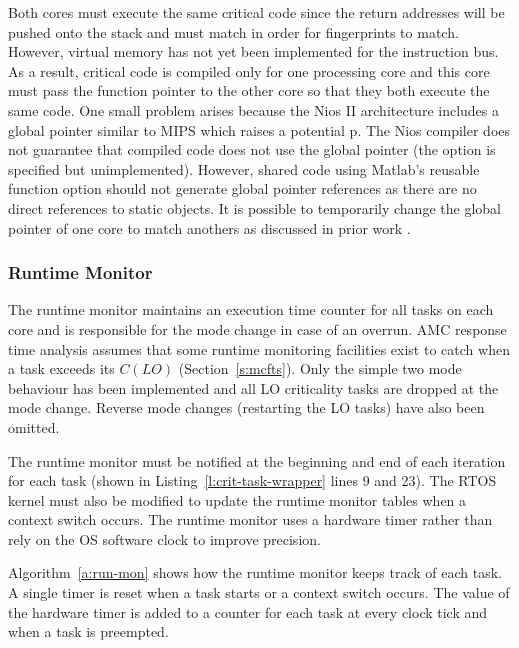 
	Both cores must execute the same critical code since the return addresses will be pushed onto the stack and must match in order for fingerprints to match. 
	However, virtual memory has not yet been implemented for the instruction bus. 
	As a result, critical code is compiled only for one processing core and this core must pass the function pointer to the other core so that they both execute the same code. 
	One small problem arises because the Nios II architecture includes a global pointer similar to MIPS which raises a potential p.
	The Nios compiler does not guarantee that compiled code does not use the global pointer (the option is specified but unimplemented). 
	However, shared code using Matlab's reusable function option should not generate global pointer references as there are no direct references to static objects. 
	It is possible to temporarily change the global pointer of one core to match anothers as discussed in prior work \cite{ugthesis}.


\subsubsection{Runtime Monitor}

	The runtime monitor maintains an execution time counter for all tasks on each core and is responsible for the mode change in case of an overrun.
	AMC response time analysis assumes that some runtime monitoring facilities exist to catch when a task exceeds its $C(LO)$ (Section~\ref{s:mcfts}). 
	Only the simple two mode behaviour has been implemented and all LO criticality tasks are dropped at the mode change. 
	Reverse mode changes (restarting the LO tasks) have also been omitted.

	The runtime monitor must be notified at the beginning and end of each iteration for each task (shown in Listing~\ref{l:crit-task-wrapper} lines 9 and 23). 
	The RTOS kernel must also be modified to update the runtime monitor tables when a context switch occurs. 
	The runtime monitor uses a hardware timer rather than rely on the OS software clock to improve precision.
	
	Algorithm~\ref{a:run-mon} shows how the runtime monitor keeps track of each task.
	A single timer is reset when a task starts or a context switch occurs.
	The value of the hardware timer is added to a counter for each task at every clock tick and when a task is preempted.

